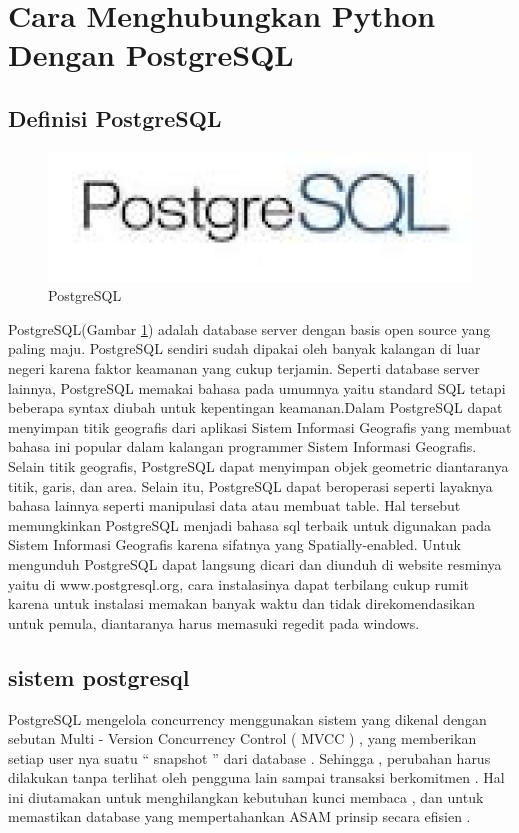 \section{Cara Menghubungkan Python Dengan PostgreSQL}

\subsection{Definisi PostgreSQL}
\begin{figure}[ht]
	\centerline{\includegraphics[width=1\textwidth]{figures/PostgreSQL.jpg}}
	\caption{PostgreSQL}
	\label{postgres}
\end{figure}
\cite{momjian2001postgresql}PostgreSQL(Gambar \ref{postgres}) adalah database server dengan basis open source yang paling maju. PostgreSQL sendiri sudah dipakai oleh banyak kalangan di luar negeri karena faktor keamanan yang cukup terjamin. Seperti database server lainnya, PostgreSQL memakai bahasa pada umumnya yaitu standard SQL tetapi beberapa syntax diubah untuk kepentingan keamanan.Dalam PostgreSQL dapat menyimpan titik geografis dari aplikasi Sistem Informasi Geografis yang membuat bahasa ini popular dalam kalangan programmer Sistem Informasi Geografis. Selain titik geografis, PostgreSQL dapat menyimpan objek geometric diantaranya titik, garis, dan area. Selain itu, PostgreSQL dapat beroperasi seperti layaknya bahasa lainnya seperti manipulasi data atau membuat table. Hal tersebut memungkinkan PostgreSQL menjadi bahasa sql terbaik untuk digunakan pada Sistem Informasi Geografis karena sifatnya yang Spatially-enabled. Untuk mengunduh PostgreSQL dapat langsung dicari dan diunduh di website resminya yaitu di www.postgresql.org, cara instalasinya dapat terbilang cukup rumit karena untuk instalasi memakan banyak waktu dan tidak direkomendasikan untuk pemula, diantaranya harus memasuki regedit pada windows. 

\subsection { sistem postgresql }
PostgreSQL mengelola concurrency menggunakan sistem yang dikenal dengan sebutan Multi - Version Concurrency Control ( MVCC ) , yang memberikan setiap user nya suatu “ snapshot ” dari database . Sehingga , perubahan harus dilakukan tanpa terlihat oleh pengguna lain sampai transaksi berkomitmen . Hal ini diutamakan untuk menghilangkan kebutuhan kunci membaca , dan untuk memastikan database yang mempertahankan ASAM prinsip secara efisien .

